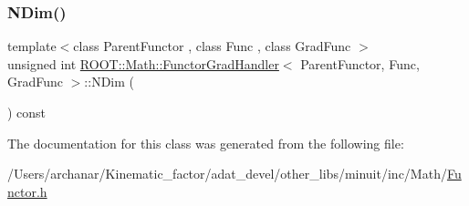 \mbox{\label{classROOT_1_1Math_1_1FunctorGradHandler_a9fd1149654daac8b76a15f877663ff82}} 
\subsubsection{\texorpdfstring{NDim()}{NDim()}\hspace{0.1cm}{\footnotesize\ttfamily [2/2]}}
{\footnotesize\ttfamily template$<$class Parent\+Functor , class Func , class Grad\+Func $>$ \\
unsigned int \mbox{\hyperlink{classROOT_1_1Math_1_1FunctorGradHandler}{R\+O\+O\+T\+::\+Math\+::\+Functor\+Grad\+Handler}}$<$ Parent\+Functor, Func, Grad\+Func $>$\+::N\+Dim (\begin{DoxyParamCaption}{ }\end{DoxyParamCaption}) const\hspace{0.3cm}{\ttfamily [inline]}}



The documentation for this class was generated from the following file\+:\begin{DoxyCompactItemize}
\item 
/\+Users/archanar/\+Kinematic\+\_\+factor/adat\+\_\+devel/other\+\_\+libs/minuit/inc/\+Math/\mbox{\hyperlink{other__libs_2minuit_2inc_2Math_2Functor_8h}{Functor.\+h}}\end{DoxyCompactItemize}
